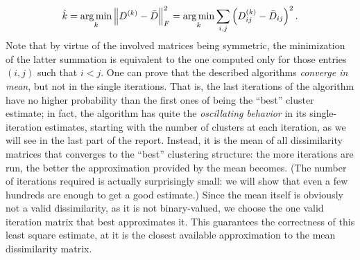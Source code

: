 $$
\hat{k} = \operatorname*{arg\,min}_k \left\lVert D^{(k)} - \bar D \right\rVert_F^2 = \operatorname*{arg\,min}_k \sum_{i,j} \left( D^{(k)}_{ij} - \bar{D}_{ij} \right)^2.
$$
Note that by virtue of the involved matrices being symmetric, the minimization of the latter summation is equivalent to the one computed only for those entries $(i,j)$ such that $i<j$.
One can prove that the described algorithms \emph{converge in mean}, but not in the single iterations.
That is, the last iterations of the algorithm have no higher probability than the first ones of being the ``best'' cluster estimate; in fact, the algorithm has quite the \emph{oscillating behavior} in its single-iteration estimates, starting with the number of clusters at each iteration, as we will see in the last part of the report.
Instead, it is the mean of all dissimilarity matrices that converges to the ``best'' clustering structure: the more iterations are run, the better the approximation provided by the mean becomes.
(The number of iterations required is actually surprisingly small: we will show that even a few hundreds are enough to get a good estimate.)
Since the mean itself is obviously not a valid dissimilarity, as it is not binary-valued, we choose the one valid iteration matrix that best approximates it.
This guarantees the correctness of this least square estimate, at it is the closest available approximation to the mean dissimilarity matrix.



